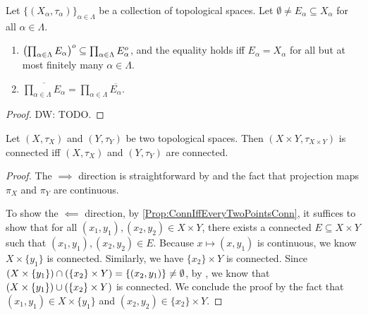 \documentclass{techreport}
\newcommand{\diw}[1]{{\color{Red} DW: #1}}
\begin{document}
\begin{proposition}\label{Prop:IntProdSubProdIntAndCloProdEqProdClo}
	Let $\{(X_\alpha,\tau_\alpha)\}_{\alpha \in \Lambda}$ be a collection of topological spaces.
	Let $\emptyset \neq E_\alpha \subseteq X_\alpha$ for all $\alpha \in \Lambda$.
	\begin{enumerate}
		\item $\left({\prod_{\alpha \in \Lambda} E_\alpha}\right)^o \subseteq \prod_{\alpha \in \Lambda} E_\alpha^o$, and the equality holds iff $E_\alpha = X_\alpha$ for all but at most finitely many $\alpha \in \Lambda$.
		\item $\overline{\prod_{\alpha \in \Lambda} E_\alpha} = \prod_{\alpha \in \Lambda} \overline{E_\alpha}$.
	\end{enumerate}
\end{proposition}
\begin{proof}
	\diw{TODO.}
\end{proof}

\begin{proposition}\label{Prop:ProdConnIffBothConn}
	Let $(X,\tau_X)$ and $(Y,\tau_Y)$ be two topological spaces.
	Then $(X\times Y,\tau_{X \times Y})$ is connected iff $(X,\tau_X)$ and $(Y,\tau_Y)$ are connected.
\end{proposition}
\begin{proof}
	The $\implies$ direction is straightforward by  and the fact that projection maps $\pi_X$ and $\pi_Y$ are continuous.
	
	To show the $\impliedby$ direction, by \ref{Prop:ConnIffEveryTwoPointsConn}, it suffices to show that for all $(x_1,y_1),(x_2,y_2) \in X \times Y$, there exists a connected $E \subseteq X \times Y$ such that $(x_1,y_1),(x_2,y_2) \in E$.
	Because $x \mapsto (x,y_1)$ is continuous, we know $X \times \{y_1\}$ is connected.
	Similarly, we have $\{x_2\} \times Y$ is connected.
	Since $(X \times \left\{ {y_1} \right\}) \cap (\left\{ {x_2} \right\} \times Y) = \{ (x_2,y_1) \} \neq \emptyset$, by , we know that $(X \times \left\{ {y_1} \right\}) \cup (\left\{ {x_2} \right\} \times Y)$ is connected.
	We conclude the proof by the fact that $(x_1,y_1) \in X \times \{y_1\}$ and $(x_2,y_2) \in \{x_2\} \times Y$.
\end{proof}
\end{document}
